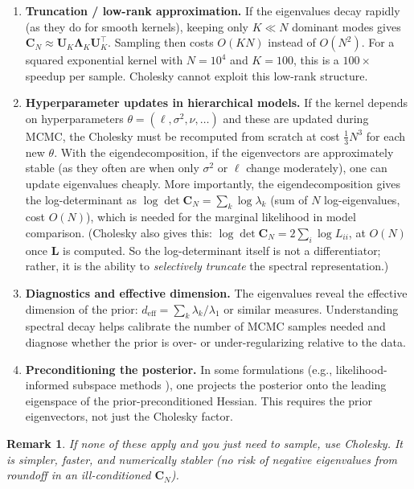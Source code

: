 \documentclass[11pt]{article}
\newtheorem{remark}{Remark}
\newcommand{\Cov}{\mathbf{C}}
\newcommand{\bL}{\mathbf{L}}
\newcommand{\bU}{\mathbf{U}}
\newcommand{\bLambda}{\boldsymbol{\Lambda}}
\begin{document}
\begin{enumerate}[nosep, leftmargin=*]
  \item \textbf{Truncation / low-rank approximation.}  If the eigenvalues decay rapidly (as they do for smooth kernels), keeping only $K \ll N$ dominant modes gives $\Cov_N \approx \bU_K \bLambda_K \bU_K^\top$.  Sampling then costs $O(KN)$ instead of $O(N^2)$.  For a squared exponential kernel with $N = 10^4$ and $K = 100$, this is a $100\times$ speedup per sample.  Cholesky cannot exploit this low-rank structure.

  \item \textbf{Hyperparameter updates in hierarchical models.}  If the kernel depends on hyperparameters $\theta = (\ell, \sigma^2, \nu, \ldots)$ and these are updated during MCMC, the Cholesky must be recomputed from scratch at cost $\frac{1}{3}N^3$ for each new $\theta$.  With the eigendecomposition, if the eigenvectors are approximately stable (as they often are when only $\sigma^2$ or $\ell$ change moderately), one can update eigenvalues cheaply.  More importantly, the eigendecomposition gives the log-determinant as $\log\det \Cov_N = \sum_k \log \lambda_k$ (sum of $N$ log-eigenvalues, cost $O(N)$), which is needed for the marginal likelihood in model comparison.  (Cholesky also gives this: $\log\det \Cov_N = 2\sum_i \log L_{ii}$, at $O(N)$ once $\bL$ is computed.  So the log-determinant itself is not a differentiator; rather, it is the ability to \emph{selectively truncate} the spectral representation.)

  \item \textbf{Diagnostics and effective dimension.}  The eigenvalues reveal the effective dimension of the prior: $d_{\text{eff}} = \sum_k \lambda_k / \lambda_1$ or similar measures.  Understanding spectral decay helps calibrate the number of MCMC samples needed and diagnose whether the prior is over- or under-regularizing relative to the data.

  \item \textbf{Preconditioning the posterior.}  In some formulations (e.g., likelihood-informed subspace methods \cite{CuiMartinMarzoukEtAl2014}), one projects the posterior onto the leading eigenspace of the prior-preconditioned Hessian.  This requires the prior eigenvectors, not just the Cholesky factor.
\end{enumerate}

\begin{remark}
If none of these apply and you just need to sample, use Cholesky.  It is simpler, faster, and numerically stabler (no risk of negative eigenvalues from roundoff in an ill-conditioned $\Cov_N$).
\end{remark}
\end{document}
